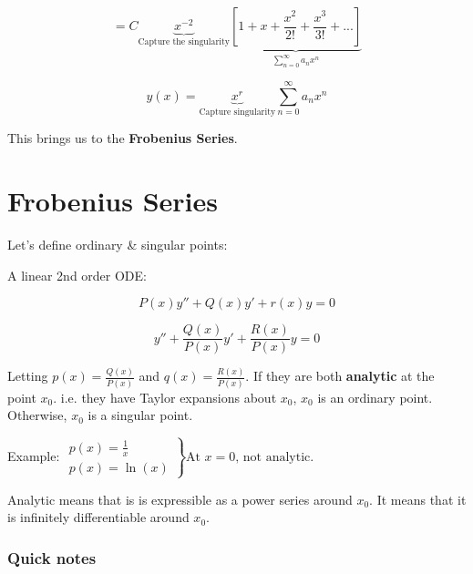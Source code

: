 \documentclass{article}
\begin{document}
$$ = C \underbrace{x^{-2}}_{\text{Capture the singularity}} \underbrace{\left[ 1 + x + \frac{x^2}{2!} + \frac{x^3}{3!} + ... \right]}_{\sum_{n = 0}^{\infty} a_n x^n}$$

$$ y(x) = \underbrace{x^r}_{\text{Capture singularity}} \sum_{n = 0}^{\infty} a_n x^n$$

This brings us to the \textbf{Frobenius Series}. 

\section{Frobenius Series}

Let's define ordinary \& singular points:

A linear 2nd order ODE:

$$P(x) y'' + Q(x) y' + r(x) y = 0$$

$$y'' + \frac{Q(x)}{P(x)} y' + \frac{R(x)}{P(x)} y = 0$$

Letting $p(x) = \frac{Q(x)}{P(x)}$ and $q(x) = \frac{R(x)}{P(x)}$. If they are both \textbf{analytic} at the point $x_0$. i.e. they have Taylor expansions about $x_0$, $x_0$ is an ordinary point. Otherwise, $x_0$ is a singular point. 

Example: $\left. \begin{matrix} p(x) = \frac{1}{x} \\ p(x) = \ln(x) \end{matrix} \right\} \text{At } x = 0 \text{, not analytic}$.

Analytic means that is is expressible as a power series around $x_0$. It means that it is infinitely differentiable around $x_0$. 

\subsubsection{Quick notes}
\end{document}
